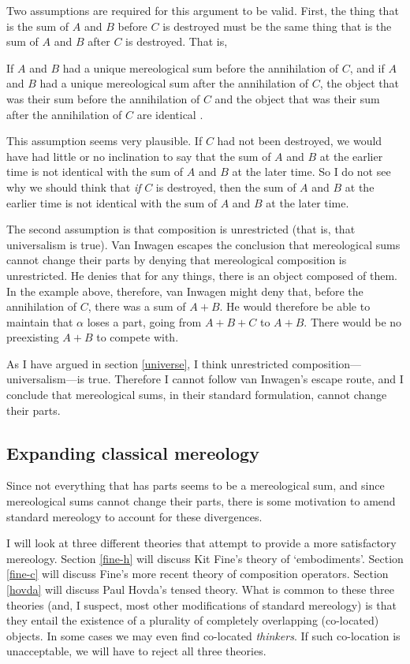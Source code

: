 \documentclass[11pt]{article}
\newenvironment{squote}{%
\begin{spacing}{1}
\begin{list}{}{%
\setlength{\labelwidth}{0pt}%
\rightmargin\leftmargin%
}
\item\relax
}{%
\end{list}%
\end{spacing}
}
\begin{document}
\begin{spacing}{1.5}
Two assumptions are required for this argument to be valid.  First,
the thing that is the sum of $A$ and $B$ before $C$ is destroyed must
be the same thing that is the sum of $A$ and $B$ after $C$ is
destroyed.  That is,

\begin{squote}
If $A$ and $B$ had a unique mereological sum before the annihilation
of $C$, and if $A$ and $B$ had a unique mereological sum after the
annihilation of $C$, the object that was their sum before the
annihilation of $C$ and the object that was their sum after the
annihilation of $C$ are identical \citep[629]{inwagen2006}.
\end{squote}

This assumption seems very plausible.  If $C$ had not been destroyed,
we would have had little or no inclination to say that the sum of $A$
and $B$ at the earlier time is not identical with the sum of $A$ and
$B$ at the later time.  So I do not see why we should think that {\em
  if} $C$ is destroyed, then the sum of $A$ and $B$ at the earlier
time is not identical with the sum of $A$ and $B$ at the later time.

The second assumption is that composition is unrestricted (that is,
that universalism is true).  Van Inwagen escapes the conclusion that
mereological sums cannot change their parts by denying that
mereological composition is unrestricted.  He denies that for any
things, there is an object composed of them.  In the example above,
therefore, van Inwagen might deny that, before the annihilation of
$C$, there was a sum of $A + B$.  He would therefore be able to
maintain that $\alpha$ loses a part, going from $A + B + C$ to $A +
B$.  There would be no preexisting $A + B$ to compete with.

As I have argued in section \ref{universe}, I think unrestricted
composition---universalism---is true.  Therefore I cannot follow van
Inwagen's escape route, and I conclude that mereological sums, in
their standard formulation, cannot change their parts.

\subsection{Expanding classical mereology}
\label{expand}
Since not everything that has parts seems to be a mereological sum,
and since mereological sums cannot change their parts, there is some
motivation to amend standard mereology to account for these
divergences.

I will look at three different theories that attempt to provide a more
satisfactory mereology.  Section \ref{fine-h} will discuss Kit Fine's
theory of `embodiments'.  Section \ref{fine-c} will discuss Fine's
more recent theory of composition operators.  Section \ref{hovda} will
discuss Paul Hovda's tensed theory.  What is common to these three
theories (and, I suspect, most other modifications of standard
mereology) is that they entail the existence of a plurality of
completely overlapping (co-located) objects.  In some cases we may
even find co-located {\em thinkers}.  If such co-location is
unacceptable, we will have to reject all three theories.


\end{spacing}
\end{document}
